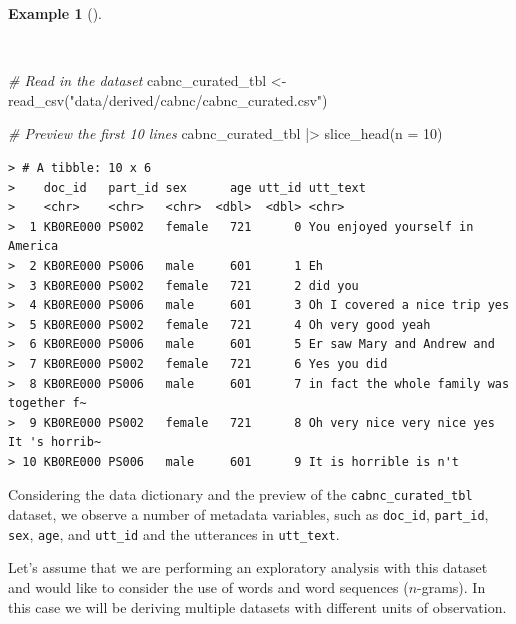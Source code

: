 \documentclass[
  letterpaper,
  DIV=11,
  numbers=noendperiod]{scrreport}
\newenvironment{Shaded}{\begin{snugshade}}{\end{snugshade}}
\newcommand{\AttributeTok}[1]{\textcolor[rgb]{0.00,0.00,0.00}{#1}}
\newcommand{\CommentTok}[1]{\textcolor[rgb]{0.00,0.00,0.00}{\textit{#1}}}
\newcommand{\DecValTok}[1]{\textcolor[rgb]{0.00,0.00,0.00}{#1}}
\newcommand{\FunctionTok}[1]{\textcolor[rgb]{0.00,0.00,0.00}{#1}}
\newcommand{\NormalTok}[1]{\textcolor[rgb]{0.00,0.00,0.00}{#1}}
\newcommand{\OtherTok}[1]{\textcolor[rgb]{0.00,0.00,0.00}{#1}}
\newcommand{\SpecialCharTok}[1]{\textcolor[rgb]{0.00,0.00,0.00}{#1}}
\newcommand{\StringTok}[1]{\textcolor[rgb]{0.00,0.00,0.00}{#1}}
\theoremstyle{definition}
\newtheorem{example}{Example}[chapter]
\theoremstyle{remark}
\begin{document}
\begin{example}[]\protect\hypertarget{exm-td-cabnc-dataset-read-show}{}\label{exm-td-cabnc-dataset-read-show}

~

\begin{Shaded}
\begin{Highlighting}[]
\CommentTok{\# Read in the dataset}
\NormalTok{cabnc\_curated\_tbl }\OtherTok{\textless{}{-}}
  \FunctionTok{read\_csv}\NormalTok{(}\StringTok{"data/derived/cabnc/cabnc\_curated.csv"}\NormalTok{)}

\CommentTok{\# Preview the first 10 lines}
\NormalTok{cabnc\_curated\_tbl }\SpecialCharTok{|\textgreater{}}
  \FunctionTok{slice\_head}\NormalTok{(}\AttributeTok{n =} \DecValTok{10}\NormalTok{)}
\end{Highlighting}
\end{Shaded}

\begin{verbatim}
> # A tibble: 10 x 6
>    doc_id   part_id sex      age utt_id utt_text                                
>    <chr>    <chr>   <chr>  <dbl>  <dbl> <chr>                                   
>  1 KB0RE000 PS002   female   721      0 You enjoyed yourself in America         
>  2 KB0RE000 PS006   male     601      1 Eh                                      
>  3 KB0RE000 PS002   female   721      2 did you                                 
>  4 KB0RE000 PS006   male     601      3 Oh I covered a nice trip yes            
>  5 KB0RE000 PS002   female   721      4 Oh very good yeah                       
>  6 KB0RE000 PS006   male     601      5 Er saw Mary and Andrew and              
>  7 KB0RE000 PS002   female   721      6 Yes you did                             
>  8 KB0RE000 PS006   male     601      7 in fact the whole family was together f~
>  9 KB0RE000 PS002   female   721      8 Oh very nice very nice yes It 's horrib~
> 10 KB0RE000 PS006   male     601      9 It is horrible is n't
\end{verbatim}

\end{example}

Considering the data dictionary and the preview of the
\texttt{cabnc\_curated\_tbl} dataset, we observe a number of metadata
variables, such as \texttt{doc\_id}, \texttt{part\_id}, \texttt{sex},
\texttt{age}, and \texttt{utt\_id} and the utterances in
\texttt{utt\_text}.

Let's assume that we are performing an exploratory analysis with this
dataset and would like to consider the use of words and word sequences
(\(n\)-grams). In this case we will be deriving multiple datasets with
different units of observation.
\end{document}

